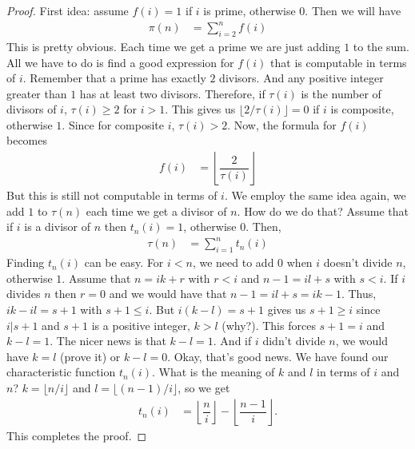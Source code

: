 \documentclass{subfiles}
\begin{document}
			\begin{proof}
				First idea: assume $f(i)=1$ if $i$ is prime, otherwise $0$. Then we will have
					\begin{align*}
						\pi(n) & = \sum_{i=2}^{n}f(i)
					\end{align*}
				This is pretty obvious. Each time we get a prime we are just adding $1$ to the sum. All we have to do is find a good expression for $f(i)$ that is computable in terms of $i$. Remember that  a prime has exactly $2$ divisors. And any positive integer greater than $1$ has at least two divisors. Therefore, if $\tau(i)$ is the number of divisors of $i$, $\tau(i)\geq2$ for $i>1$. This gives us $\lfloor 2/\tau(i)\rfloor=0$ if $i$ is composite, otherwise $1$. Since for composite $i$, $\tau(i)>2$. Now, the formula for $f(i)$ becomes
					\begin{align*}
						f(i) & = \left\lfloor\dfrac{2}{\tau(i)}\right\rfloor
					\end{align*}
				But this is still not computable in terms of $i$. We employ the same idea again, we add $1$ to $\tau(n)$ each time we get a divisor of $n$. How do we do that? Assume that if $i$ is a divisor of $n$ then $t_n(i)=1$, otherwise $0$. Then,
					\begin{align*}
						\tau(n) & = \sum_{i=1}^{n}t_n(i)
					\end{align*}
				Finding $t_n(i)$ can be easy. For $i<n$, we need to add $0$ when $i$ doesn't divide $n$, otherwise $1$. Assume that $n=ik+r$ with $r<i$ and $n-1=il+s$ with $s<i$. If $i$ divides $n$ then $r=0$ and we would have that $n-1=il+s=ik-1$. Thus, $ik-il=s+1$ with $s+1\leq i$. But $i(k-l)=s+1$ gives us $s+1\geq i$ since $i|s+1$ and $s+1$ is a positive integer, $k>l$ (why?). This forces $s+1=i$ and $k-l=1$. The nicer news is that $k-l=1$. And if $i$ didn't divide $n$, we would have $k=l$ (prove it) or $k-l=0$. Okay, that's good news. We have found our characteristic function $t_n(i)$. What is the meaning of $k$ and $l$ in terms of $i$ and $n$? $k=\lfloor n/i\rfloor$ and $l=\lfloor (n-1)/i\rfloor$, so we get
					\begin{align*}
						t_n(i) & = \left\lfloor\dfrac{n}{i}\right\rfloor-\left\lfloor\dfrac{n-1}{i}\right\rfloor.
					\end{align*}
				This completes the proof.
			\end{proof}
\end{document}
